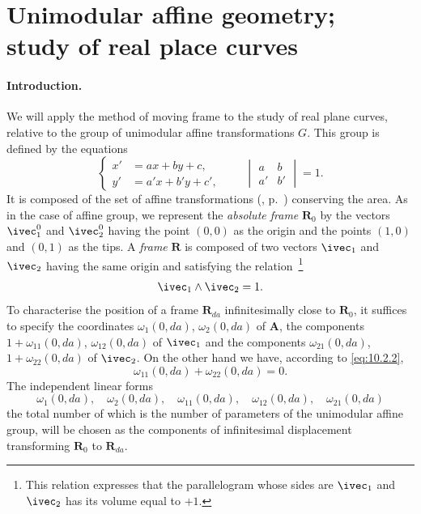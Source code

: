 \section[{Unimodular affine geometry; study of real place curves}]{Unimodular affine geometry;\\study of real place curves}
\label{sec:unim-affine-geom}

\paragraph{Introduction.}
\label{sec:133}
We will apply the method of moving frame to the study of real plane curves, relative to the group of unimodular affine transformations $G$. This group is defined by the equations
\setcounter{equation}{0}
\begin{equation}
  \label{eq:10.2.1}
  \left\{
    \begin{aligned}
      x'&=ax+by+c,\\
      y'&=a'x+b'y+c',
    \end{aligned}
  \right.
  \qquad
  \begin{vmatrix}
    a&b\\
    a'&b'
  \end{vmatrix}
  =1.
\end{equation}
It is composed of the set of affine transformations (, p.~\pageref{sec:65}) conserving the area. As in the case of affine group, we represent the \emph{absolute frame} $\mathbf{R}_{0}$ by the vectors $\ivec^{0}_{1}$ and $\ivec^{0}_{2}$ having the point $(0,0)$ as the origin and the points $(1,0)$ and $(0,1)$ as the tips. A \emph{frame} $\mathbf{R}$ is composed of two vectors $\ivec_{1}$ and $\ivec_{2}$ having the same origin and satisfying the relation~\footnote{This relation expresses that the parallelogram whose sides are $\ivec_{1}$ and $\ivec_{2}$ has its volume equal to $+1$.}
\begin{equation}
  \label{eq:10.2.2}
  \ivec_{1}\wedge\ivec_{2}=1.
\end{equation}
To characterise the position of a frame $\mathbf{R}_{da}$ infinitesimally close to $\mathbf{R}_{0}$, it suffices to specify the coordinates $\omega_{1}(0,da)$, $\omega_{2}(0,da)$ of $\mathbf{A}$, the components $1+\omega_{11}(0,da)$, $\omega_{12}(0,da)$ of $\ivec_{1}$ and the components $\omega_{21}(0,da)$, $1+\omega_{22}(0,da)$ of $\ivec_{2}$. On the other hand we have, according to \eqref{eq:10.2.2},
\[
\omega_{11}(0,da)+\omega_{22}(0,da)=0.
\]
The independent linear forms
\[
\omega_{1}(0,da),\quad\omega_{2}(0,da),\quad\omega_{11}(0,da),\quad\omega_{12}(0,da),\quad\omega_{21}(0,da)
\]
the total number of which is the number of parameters of the unimodular affine group, will be chosen as the components of infinitesimal displacement transforming $\mathbf{R}_{0}$ to $\mathbf{R}_{da}$.


